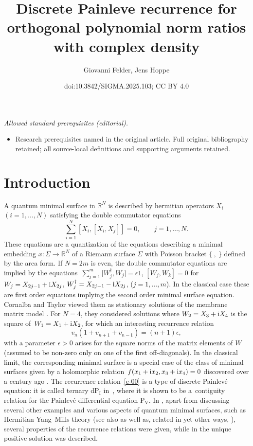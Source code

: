 \documentclass[10pt,a4paper]{amsart}
\title{Discrete Painleve recurrence for orthogonal polynomial norm ratios with complex density}
\author{Giovanni Felder, Jens Hoppe}
\date{doi:10.3842/SIGMA.2025.103; CC BY 4.0}
\numberwithin{equation}{section}
\theoremstyle{definition}
\begin{document}
\maketitle
\noindent\textit{Allowed standard prerequisites (editorial).}\begin{itemize}
\item Research prerequisites named in the original article. Full original bibliography retained; all source-local definitions and supporting arguments retained.
\end{itemize}\medskip
\section{Introduction}
A quantum minimal surface \cite{Hoppe1982,Hoppe1996,IKKT1997} in $\mathbb R^N$ is described by hermitian operators $X_i$ $(i=1,\dots,N)$ satisfying the double commutator equations
\[
\sum_{i=1}^N[X_i,[X_i,X_j]]=0, \qquad j=1,\dots,N.
\]
These equations are a quantization of the equations  describing a minimal embedding $x\colon\Sigma\to \mathbb R^N$ of a Riemann surface $\Sigma$ with Poisson bracket $\{\ ,\ \}$ defined by the area form. If $N=2m$ is even, the double commutator equations are implied by the equations~${\sum_{j=1}^m\big[W_j^\dagger,W_j\big]=\epsilon 1}$, $[W_j,W_k]=0$ for $W_j=X_{2j-1}+{\rm i}X_{2j}$, $W_j^\dagger=X_{2j-1}-{\rm i}X_{2j}$, ($j=1,\dots,m$). In the classical case these are first order equations implying the second order minimal surface equation. Cornalba and Taylor \cite{CornalbaTaylor1999} viewed them as stationary solutions of the membrane matrix model \cite{Hoppe1982}. For $N=4$, they considered solutions where $W_2=X_3 + {\rm i} X_4$ is the square of~${W_1=X_1 +{\rm i} X_2}$, for which an interesting recurrence relation
\begin{equation}\label{e-00}
v_n(1+v_{n+1}+v_{n-1})=(n+1)\epsilon,
\end{equation}
with a parameter $\epsilon>0$ arises for the square norms of the matrix elements of $W$ (assumed to be non-zero only on one of the first off-diagonals). In the classical limit, the corresponding minimal surface is a special case of the class of minimal surfaces given by a holomorphic relation~${f(x_1+{\rm i}x_2,x_3+{\rm i}x_4)=0}$ discovered over a century ago \cite{Eisenhart1912,Kommerell1905}. The recurrence relation~\eqref{e-00} is a type of discrete Painlev\'e equation: it is called ternary dP${}_{\mathrm{I}}$ in~\cite{Tokihiro2002}, where it is shown to be a~contiguity relation for the Painlev\'e differential equation P${}_{\mathrm V}$.
In \cite{AHK2019}, apart from discussing several other examples and various aspects of quantum minimal surfaces, such as Hermitian Yang--Mills theory (see also \cite{Connes2002, Herscovich2011} as well as, related in yet other ways, \cite{ACH2016,AHH2012}), several properties of the recurrence relations were given, while in \cite{CDHM2025,Hoppe2025}
the unique positive solution was described.
\end{document}
